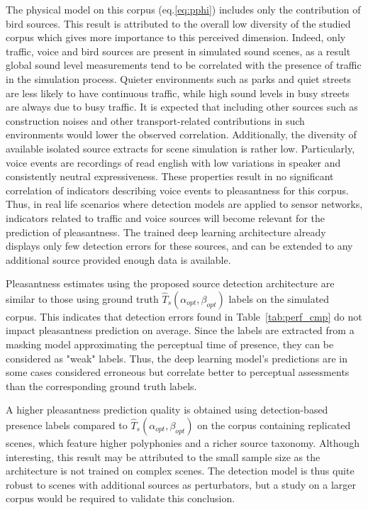 \documentclass[twocolumn]{article}
\begin{document}
The physical model on this corpus (eq.\ref{eq:pphi}) includes only the contribution of bird sources. This result is attributed to the overall low diversity of the studied corpus which gives more importance to this perceived dimension. Indeed, only traffic, voice and bird sources are present in simulated sound scenes, as a result global sound level measurements tend to be correlated with the presence of traffic in the simulation process. Quieter environments such as parks and quiet streets are less likely to have continuous traffic, while high sound levels in busy streets are always due to busy traffic. It is expected that including other sources such as construction noises and other transport-related contributions in such environments would lower the observed correlation. Additionally, the diversity of available isolated source extracts for scene simulation is rather low. Particularly, voice events are recordings of read english with low variations in speaker and consistently neutral expressiveness. These properties result in no significant correlation of indicators describing voice events to pleasantness for this corpus. Thus, in real life scenarios where detection models are applied to sensor networks, indicators related to traffic and voice sources will become relevant for the prediction of pleasantness. The trained deep learning architecture already displays only few detection errors for these sources, and can be extended to any additional source provided enough data is available.

Pleasantness estimates using the proposed source detection architecture are similar to those using ground truth $\hat T_s(\alpha_{opt}, \beta_{opt})$ labels on the simulated corpus. This indicates that detection errors found in Table~\ref{tab:perf_cmp} do not impact pleasantness prediction on average. Since the labels are extracted from a masking model approximating the perceptual time of presence, they can be considered as "weak" labels. Thus, the deep learning model's predictions are in some cases considered erroneous but correlate better to perceptual assessments than the corresponding ground truth labels.

A higher pleasantness prediction quality is obtained using detection-based presence labels compared to $\hat T_s(\alpha_{opt}, \beta_{opt})$ on the corpus containing replicated scenes, which feature higher polyphonies and a richer source taxonomy. Although interesting, this result may be attributed to the small sample size as the architecture is not trained on complex scenes. The detection model is thus quite robust to scenes with additional sources as perturbators, but a study on a larger corpus would be required to validate this conclusion.
\end{document}
